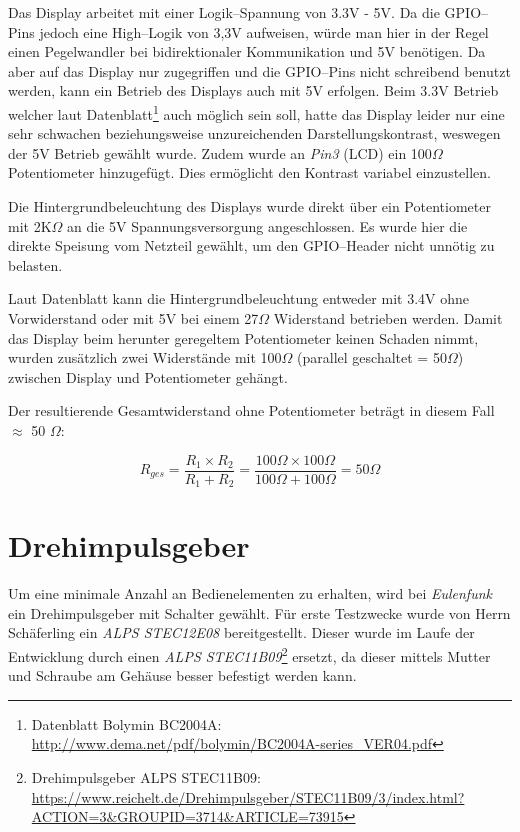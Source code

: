 \documentclass[11pt,ngerman,toc=listof,index=totoc]{scrreprt}
\begin{document}
Das Display arbeitet mit einer Logik--Spannung von 3.3V - 5V. Da die
GPIO--Pins jedoch eine High--Logik von 3,3V aufweisen, würde man hier in
der Regel einen Pegelwandler bei bidirektionaler Kommunikation und 5V
benötigen. Da aber auf das Display nur zugegriffen und die GPIO--Pins
nicht schreibend benutzt werden, kann ein Betrieb des Displays auch mit
5V erfolgen. Beim 3.3V Betrieb welcher laut Datenblatt\footnote{Datenblatt
  Bolymin BC2004A:
  \url{http://www.dema.net/pdf/bolymin/BC2004A-series_VER04.pdf}} auch
möglich sein soll, hatte das Display leider nur eine sehr schwachen
beziehungsweise unzureichenden Darstellungskontrast, weswegen der 5V
Betrieb gewählt wurde. Zudem wurde an \emph{Pin3} (LCD) ein
100\(\Omega\) Potentiometer hinzugefügt. Dies ermöglicht den Kontrast
variabel einzustellen.

Die Hintergrundbeleuchtung des Displays wurde direkt über ein
Potentiometer mit 2K\(\Omega\) an die 5V Spannungsversorgung
angeschlossen. Es wurde hier die direkte Speisung vom Netzteil gewählt,
um den GPIO--Header nicht unnötig zu belasten.

Laut Datenblatt kann die Hintergrundbeleuchtung entweder mit 3.4V ohne
Vorwiderstand oder mit 5V bei einem 27\(\Omega\) Widerstand betrieben
werden. Damit das Display beim herunter geregeltem Potentiometer keinen
Schaden nimmt, wurden zusätzlich zwei Widerstände mit 100\(\Omega\)
(parallel geschaltet = 50\(\Omega\)) zwischen Display und Potentiometer
gehängt.

Der resultierende Gesamtwiderstand ohne Potentiometer beträgt in diesem
Fall \(\approx\) 50 \(\Omega\):

\[  R_{ges} = \frac{R_1 \times R_2}{R_1 + R_2} = \frac{100\Omega \times 100\Omega}{100\Omega + 100\Omega} = 50\Omega \]

\section{Drehimpulsgeber}\label{drehimpulsgeber}

Um eine minimale Anzahl an Bedienelementen zu erhalten, wird bei
\emph{Eulenfunk} ein Drehimpulsgeber mit Schalter gewählt. Für erste
Testzwecke wurde von Herrn Schäferling ein \emph{ALPS STEC12E08}
bereitgestellt. Dieser wurde im Laufe der Entwicklung durch einen
\emph{ALPS STEC11B09}\footnote{Drehimpulsgeber ALPS STEC11B09:
  \url{https://www.reichelt.de/Drehimpulsgeber/STEC11B09/3/index.html?ACTION=3&GROUPID=3714&ARTICLE=73915}}
ersetzt, da dieser mittels Mutter und Schraube am Gehäuse besser
befestigt werden kann.
\end{document}
